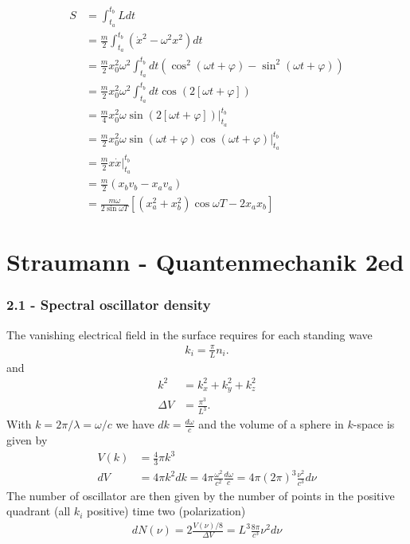 \documentclass[10pt,a4paper]{book}
\theoremstyle{definition}
\begin{document}
\begin{align}
    S&=\int_{t_a}^{t_b}L dt\\
    &=\frac{m}{2}\int_{t_a}^{t_b}(\dot x^2-\omega^2x^2) dt\\
    &=\frac{m}{2}x_0^2\omega^2\int_{t_a}^{t_b}dt\left(\cos^2(\omega t+\varphi)-\sin^2(\omega t+\varphi)\right)\\
    &=\frac{m}{2}x_0^2\omega^2\int_{t_a}^{t_b}dt\cos(2[\omega t+\varphi])\\
    &=\frac{m}{4}x_0^2\omega\sin(2[\omega t+\varphi])|_{t_a}^{t_b}\\
    &=\frac{m}{2}x_0^2\omega\sin(\omega t+\varphi)\cos(\omega t+\varphi)|_{t_a}^{t_b}\\
    &=\frac{m}{2} x \dot x|_{t_a}^{t_b}\\
    &=\frac{m}{2}(x_bv_b-x_av_a)\\
    &=\frac{m\omega}{2\sin\omega T}\left[(x_a^2+x_b^2)\cos\omega T-2x_ax_b\right]
\end{align}

\section{{\sc Straumann} - Quantenmechanik 2ed}
\subsubsection{2.1 - Spectral oscillator density}
The vanishing electrical field in the surface requires for each standing wave
\begin{align}
    k_i=\frac{\pi}{L}n_i. 
\end{align}
and
\begin{align}
    k^2&=k_x^2+k_y^2+k_z^2\\
    \Delta V&=\frac{\pi^3}{L^3}.
\end{align}
With $k=2\pi/\lambda = \omega/c$ we have $dk=\frac{d\omega}{c}$ and the volume of a sphere in $k$-space is given by
\begin{align}
    V(k)&=\frac{4}{3}\pi k^3\\
    dV&=4\pi k^2 dk=4\pi \frac{\omega^2}{c^2} \frac{d\omega}{c} 
    =4\pi (2\pi)^3\frac{\nu^2}{c^3} d\nu 
\end{align}
The number of oscillator are then given by the number of points in the positive quadrant (all $k_i$ positive) time two (polarization)
\begin{align}
    dN(\nu)=2\frac{V(\nu)/8}{\Delta V}=L^3 \frac{8\pi}{c^3}\nu^2d\nu
\end{align}
\end{document}
